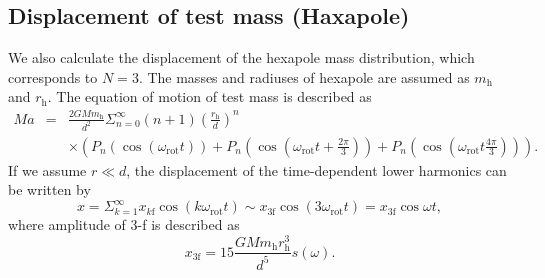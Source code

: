 \documentclass[A4]{spie}  %
\begin{document}
\subsection{Displacement of test mass (Haxapole)} \label{Hexa}
We also calculate the displacement of the hexapole mass distribution, which corresponds to $N=3$.
The masses and radiuses of hexapole are assumed as $m_{\mathrm{h}}$ and $r_{\mathrm{h}}$. 
The equation of motion of test mass is described as
\begin{eqnarray}
Ma &=& \frac{2GMm_{\mathrm{h}}}{d^2}\Sigma^{\infty}_{n=0}(n+1) \left( \frac{r_{\mathrm{h}}}{d} \right)^n \nonumber \\ 
&&\times \left( P_n\left(\cos{\left(\omega_{\mathrm{rot}} t \right)}\right) + P_n\left(\cos{\left(\omega_{\mathrm{rot}} t+\frac{2\pi}{3} \right)} \right) + P_n\left(\cos{\left(\omega_{\mathrm{rot}} t \frac{4\pi}{3} \right) }\right) \right).
\end{eqnarray} 
If we assume $r \ll d$, the displacement of the time-dependent lower harmonics can be written by 
\begin{equation}
x=\Sigma_{k=1}^{\infty}x_{k\mathrm{f}}\cos(k\omega_{\mathrm{rot}} t)\sim  x_{3\mathrm{f}}\cos(3\omega_{\mathrm{rot}} t)=x_{\mathrm{3f}}\cos{\omega t},
\end{equation}
where amplitude of 3-f is described as
\begin{equation}
 x_{3\mathrm{f}}=15\frac{GMm_{\mathrm{h}}r_{\mathrm{h}}^3}{d^5}s(\omega). \label{3f}
\end{equation}
\end{document}
